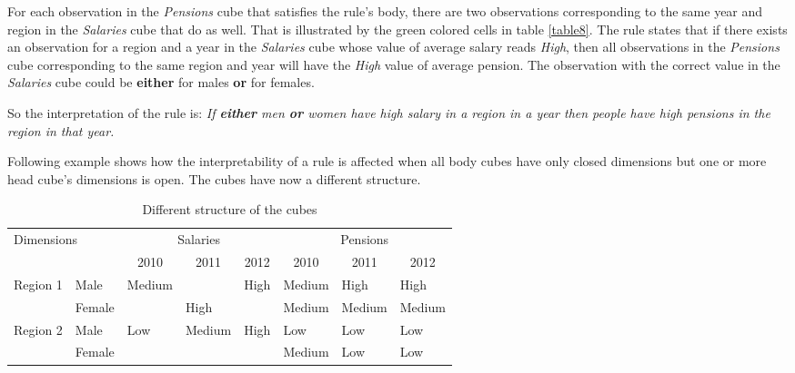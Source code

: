 For each observation in the \textit{Pensions} cube that satisfies the rule's body, there are two observations corresponding to the same year and region in the \textit{Salaries} cube that do as well. That is illustrated by the green colored cells in table \ref{table8}. The rule states that if there exists an observation for a region and a year in the \textit{Salaries} cube whose value of average salary reads \textit{High}, then all observations in the \textit{Pensions} cube corresponding to the same region and year will have the \textit{High} value of average pension. The observation with the correct value in the \textit{Salaries} cube could be \textbf{either} for males \textbf{or} for females. 

So the interpretation of the rule is: \textit{If \textbf{either} men \textbf{or} women have high salary in a region in a year then people have high pensions in the region in that year.}

Following example shows how the interpretability of a rule is affected when all body cubes have only closed dimensions but one or more head cube's dimensions is open. The cubes have now a different structure.

\begin{table}[h]
\centering
\begin{tabular}{ll|lll|lll}
\multicolumn{2}{l|}{\multirow{2}{*}{Dimensions}} & \multicolumn{3}{c|}{Salaries}                                                                             & \multicolumn{3}{c}{Pensions}                                                              \\
\multicolumn{2}{l|}{}                            & \multicolumn{1}{c}{2010} & \multicolumn{1}{c}{2011}                           & \multicolumn{1}{c|}{2012} & \multicolumn{1}{c}{2010} & \multicolumn{1}{c}{2011}           & \multicolumn{1}{c}{2012}  \\ 
\hline
\multirow{2}{*}{Region 1} & Male                 & \multirow{2}{*}{Medium}  & {\cellcolor[rgb]{1,0.647,0}}                       & \multirow{2}{*}{High}     & Medium                   & {\cellcolor[rgb]{1,0.647,0}}High   & High                      \\
                          & Female               &                          & \multirow{-2}{*}{{\cellcolor[rgb]{1,0.647,0}}High} &                           & Medium                   & {\cellcolor[rgb]{1,0.647,0}}Medium & Medium                    \\
\multirow{2}{*}{Region 2} & Male                 & \multirow{2}{*}{Low}     & \multirow{2}{*}{Medium}                            & \multirow{2}{*}{High}     & Low                      & Low                                & Low                       \\
                          & Female               &                          &                                                    &                           & Medium                   & Low                                & Low                      
\end{tabular}
\caption{Different structure of the cubes}\label{table10}
\end{table}

